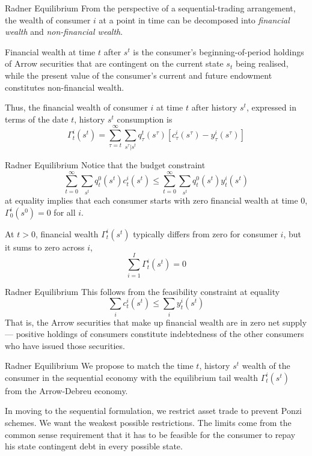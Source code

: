 \documentclass[aspectratio=169,xcolor=dvipsnames]{beamer}
\begin{document}
\begin{frame}{Radner Equilibrium}
    From the perspective of a sequential-trading arrangement, the wealth of consumer $i$ at a point in time can be decomposed into \emph{financial wealth} and \emph{non-financial wealth}.

    Financial wealth at time $t$ after $s^t$ is the consumer's beginning-of-period holdings of Arrow securities that are contingent on the current state $s_t$ being realised, while the present value of the consumer's current and future endowment constitutes non-financial wealth.

    Thus, the financial wealth of consumer $i$ at time $t$ after history $s^t$, expressed in terms of the date $t$, history $s^t$ consumption is
    \[
        \Gamma^i_t(s^t) = \sum_{\tau=t}^\infty \sum_{s^\tau | s^t} q^t_\tau(s^\tau)[c^i_\tau(s^\tau) - y^i_\tau(s^\tau)]
    \]
\end{frame}

\begin{frame}{Radner Equilibrium}
    Notice that the budget constraint
    \[
        \sum_{t=0}^\infty \sum_{s^t} q^0_t(s^t) c^i_t(s^t) \le \sum_{t=0}^\infty \sum_{s^t} q^0_t(s^t) y^i_t(s^t)
    \]
    at equality implies that each consumer starts with zero financial wealth at time 0, $\Gamma^i_0(s^0) = 0$ for all $i$.

    At $t > 0$, financial wealth $\Gamma^i_t(s^t)$ typically differs from zero for consumer $i$, but it sums to zero across $i$,
    \[
        \sum_{i=1}^I \Gamma^i_t(s^t) = 0
    \]
\end{frame}

\begin{frame}{Radner Equilibrium}
    This follows from the feasibility constraint at equality
    \[
        \sum_i c^i_t(s^t) \le \sum_i y^i_t(s^t)
    \]
    That is, the Arrow securities that make up financial wealth are in zero net supply --- positive holdings of consumers constitute indebtedness of the other consumers who have issued those securities.
\end{frame}

\begin{frame}{Radner Equilibrium}
    We propose to match the time $t$, history $s^t$ wealth of the consumer in the sequential economy with the equilibrium tail wealth $\Gamma^i_t(s^t)$ from the Arrow-Debreu economy.

    In moving to the sequential formulation, we restrict asset trade to prevent Ponzi schemes. We want the weakest possible restrictions. The limits come from the common sense requirement that it has to be feasible for the consumer to repay his state contingent debt in every possible state.
\end{frame}
\end{document}
